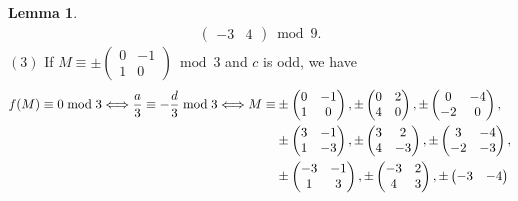 \documentclass[12pt]{article}
\theoremstyle{definition}
\newtheorem{lemma}[theorem]{Lemma}
\numberwithin{equation}{section}
\numberwithin{theorem}{section}
\begin{document}
\begin{lemma}
{\begin{align*}
\begin{pmatrix}
-3 & 4
\end{pmatrix} 
\bmod{9}.   %
\end{align*}
$\mathrm{(3)}$ If 
$
M
\equiv
\pm
\begin{pmatrix}
0 & -1 \\
1 & 0
\end{pmatrix}
\bmod{3}
$ 
and $c$ is odd, 
we have 
\begin{align*}
f(M)\equiv 0 \bmod{3} 
\Longleftrightarrow
\frac{a}{3} \equiv -\frac{d}{3} \bmod{3}
\Longleftrightarrow
M
\equiv& 
\pm
\begin{pmatrix}
0 & -1 \\
1 & 0
\end{pmatrix}, 
\pm
\begin{pmatrix}
0 & 2 \\
4 & 0
\end{pmatrix}, 
\pm
\begin{pmatrix}
0 & -4 \\
-2 & 0
\end{pmatrix},  \notag \\
&
\pm
\begin{pmatrix}
3 & -1 \\
1 & -3
\end{pmatrix},  
\pm
\begin{pmatrix}
3 & 2 \\
4 & -3
\end{pmatrix}, 
\pm
\begin{pmatrix}
3 & -4 \\
-2 & -3
\end{pmatrix}, \notag \\
&
\pm
\begin{pmatrix}
-3 & -1 \\
1 & 3
\end{pmatrix}, 
\pm
\begin{pmatrix}
-3 & 2 \\
4 & 3
\end{pmatrix},  
\pm
\begin{pmatrix}
-3 & -4 \\

\end{pmatrix}
\end{align*}}
\end{lemma}
\end{document}
